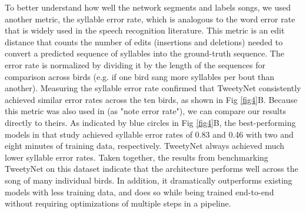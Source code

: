 \documentclass[10pt,letterpaper]{article}
\newcommand{\todotg}[1]{
\todo[bordercolor=yellow, color=yellow!40, size=\small]{#1}
}
\begin{document}
To better understand how well the network segments and labels songs, we used another metric, the syllable error rate, which is analogous to the word error rate that is widely used in the speech recognition literature. This metric is an edit distance that counts the number of edits (insertions and deletions) needed to convert a predicted sequence of syllables into the ground-truth sequence. The error rate is normalized by dividing it by the length of the sequences for comparison across birds (e.g. if one bird sang more syllables per bout than another).
Measuring the syllable error rate confirmed that TweetyNet consistently achieved similar error rates across the ten birds, as shown in 
Fig \ref{fig4}B. Because this metric was also used in \cite{koumura_automatic_2016-1} 
(as "note error rate"), we can compare our results directly to theirs. 
As indicated by blue circles in Fig \ref{fig4}B, the best-performing models in that study achieved syllable
error rates of 0.83 and 0.46 with two and eight minutes of training data, respectively. TweetyNet always
achieved much lower syllable error rates. Taken together, the results from benchmarking TweetyNet on this
dataset indicate that the architecture performs well across the song of many individual birds. In addition, it dramatically outperforms existing models with less training data, and does so while being trained end-to-end
without requiring optimizations of multiple steps in a pipeline.
\end{document}
